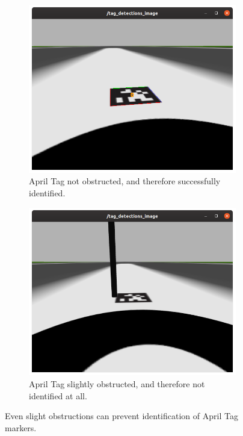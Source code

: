 \begin{figure}[ht]
    \centering
    \begin{subfigure}[b]{0.49\textwidth}
        \centering
        \includegraphics[width=\textwidth]{images/apriltag_not_obstructed.png}
        \caption{April Tag not obstructed, and therefore successfully identified.}
        \label{subfig:apriltag_not_obtructed}
    \end{subfigure}
    \begin{subfigure}[b]{0.49\textwidth}
        \centering
        \includegraphics[width=\textwidth]{images/apriltag_obstructed.png}
        \caption{April Tag slightly obstructed, and therefore not identified at all.}
        \label{subfig:apriltag_obtructed}
    \end{subfigure}
    \caption{Even slight obstructions can prevent identification of April Tag markers.}
    \label{fig:obstruction}
\end{figure}

